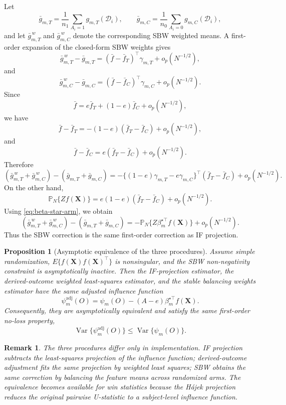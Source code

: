 \documentclass[11pt,a4paper]{article}
\newtheorem{proposition}{Proposition}
\newtheorem{remark}{Remark}
\newcommand{\Var}{\operatorname{Var}}
\begin{document}
Let
\[
\bar g_{m,T}
=
\frac1{n_1}\sum_{A_i=1}g_{m,T}(\mathcal D_i),
\qquad
\bar g_{m,C}
=
\frac1{n_0}\sum_{A_i=0}g_{m,C}(\mathcal D_i),
\]
and let \(\bar g_{m,T}^{\,w}\) and \(\bar g_{m,C}^{\,w}\) denote the corresponding SBW
weighted means. A first-order expansion of the closed-form SBW weights gives
\[
\bar g_{m,T}^{\,w}-\bar g_{m,T}
=
(\bar f-\bar f_T)^\top\gamma_{m,T}+o_p(N^{-1/2}),
\]
and
\[
\bar g_{m,C}^{\,w}-\bar g_{m,C}
=
(\bar f-\bar f_C)^\top\gamma_{m,C}+o_p(N^{-1/2}).
\]
Since
\[
\bar f=e\bar f_T+(1-e)\bar f_C+o_p(N^{-1/2}),
\]
we have
\[
\bar f-\bar f_T=-(1-e)(\bar f_T-\bar f_C)+o_p(N^{-1/2}),
\]
and
\[
\bar f-\bar f_C=e(\bar f_T-\bar f_C)+o_p(N^{-1/2}).
\]
Therefore
\[
(\bar g_{m,T}^{\,w}+\bar g_{m,C}^{\,w})
-
(\bar g_{m,T}+\bar g_{m,C})
=
-\{(1-e)\gamma_{m,T}-e\gamma_{m,C}\}^\top
(\bar f_T-\bar f_C)
+
o_p(N^{-1/2}).
\]
On the other hand,
\[
\mathbb P_N\{Zf(\mathbf X)\}
=
e(1-e)(\bar f_T-\bar f_C)+o_p(N^{-1/2}).
\]
Using \eqref{eq:beta-star-arm}, we obtain
\[
(\bar g_{m,T}^{\,w}+\bar g_{m,C}^{\,w})
-
(\bar g_{m,T}+\bar g_{m,C})
=
-\mathbb P_N\{Z\beta_m^{\star\top}f(\mathbf X)\}
+
o_p(N^{-1/2}).
\]
Thus the SBW correction is the same first-order correction as IF projection.

\begin{proposition}[Asymptotic equivalence of the three procedures]
\label{prop:three-equiv}
Assume simple randomization, \(E\{f(\mathbf X)f(\mathbf X)^\top\}\) is nonsingular, and
the SBW non-negativity constraint is asymptotically inactive. Then the IF-projection
estimator, the derived-outcome weighted least-squares estimator, and the stable balancing
weights estimator have the same adjusted influence function
\[
\psi_m^{\mathrm{adj}}(O)
=
\psi_m(O)-(A-e)\beta_m^{\star\top}f(\mathbf X).
\]
Consequently, they are asymptotically equivalent and satisfy the same first-order
no-loss property,
\[
\Var\{\psi_m^{\mathrm{adj}}(O)\}
\le
\Var\{\psi_m(O)\}.
\]
\end{proposition}

\begin{remark}
The three procedures differ only in implementation. IF projection subtracts the
least-squares projection of the influence function; derived-outcome adjustment fits the
same projection by weighted least squares; SBW obtains the same correction by balancing
the feature means across randomized arms. The equivalence becomes available for win
statistics because the H\'ajek projection reduces the original pairwise U-statistic to a
subject-level influence function.
\end{remark}
\end{document}
